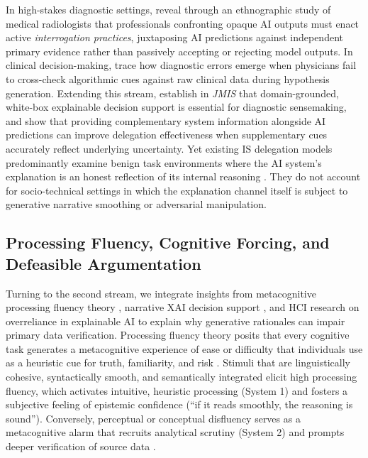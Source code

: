 \documentclass[11pt,a4paper]{article}
\begin{document}
In high-stakes diagnostic settings, \citet{lebovitz2022engage} reveal through an ethnographic study of medical radiologists that professionals confronting opaque AI outputs must enact active \textit{interrogation practices}, juxtaposing AI predictions against independent primary evidence rather than passively accepting or rejecting model outputs. In clinical decision-making, \citet{jussupow2021augmenting} trace how diagnostic errors emerge when physicians fail to cross-check algorithmic cues against raw clinical data during hypothesis generation. Extending this stream, \citet{tutun2024explainable} establish in \textit{JMIS} that domain-grounded, white-box explainable decision support is essential for diagnostic sensemaking, and \citet{taudien2026effect} show that providing complementary system information alongside AI predictions can improve delegation effectiveness when supplementary cues accurately reflect underlying uncertainty. Yet existing IS delegation models predominantly examine benign task environments where the AI system's explanation is an honest reflection of its internal reasoning \citep{burton2020systematic, tutun2024explainable, taudien2026effect}. They do not account for socio-technical settings in which the explanation channel itself is subject to generative narrative smoothing or adversarial manipulation.

\subsection{Processing Fluency, Cognitive Forcing, and Defeasible Argumentation}
\label{subsec:lit_fluency}

Turning to the second stream, we integrate insights from metacognitive processing fluency theory \citep{alter2009uniting}, narrative XAI decision support \citep{bag2025enhancing}, and HCI research on overreliance in explainable AI \citep{vasconcelos2023explanations, bucinca2021trust} to explain why generative rationales can impair primary data verification. Processing fluency theory posits that every cognitive task generates a metacognitive experience of ease or difficulty that individuals use as a heuristic cue for truth, familiarity, and risk \citep{alter2009uniting}. Stimuli that are linguistically cohesive, syntactically smooth, and semantically integrated elicit high processing fluency, which activates intuitive, heuristic processing (System 1) and fosters a subjective feeling of epistemic confidence (``if it reads smoothly, the reasoning is sound''). Conversely, perceptual or conceptual disfluency serves as a metacognitive alarm that recruits analytical scrutiny (System 2) and prompts deeper verification of source data \citep{alter2009uniting}.
\end{document}
